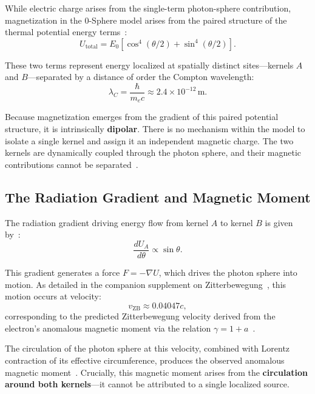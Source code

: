 \documentclass[12pt,letterpaper]{article}
\begin{document}
While electric charge arises from the single-term photon-sphere contribution, magnetization in the 0-Sphere model arises from the paired structure of the thermal potential energy terms~\cite{hanamura18356895}:
\begin{equation}
U_{\mathrm{total}} = E_0 \left[ \cos^4(\theta/2) + \sin^4(\theta/2) \right].
\end{equation}

These two terms represent energy localized at spatially distinct sites—kernels $A$ and $B$—separated by a distance of order the Compton wavelength:
\begin{equation}
\lambda_C = \frac{\hbar}{m_e c} \approx 2.4 \times 10^{-12} \, \mathrm{m}.
\end{equation}

Because magnetization emerges from the gradient of this paired potential structure, it is intrinsically \textbf{dipolar}. There is no mechanism within the model to isolate a single kernel and assign it an independent magnetic charge. The two kernels are dynamically coupled through the photon sphere, and their magnetic contributions cannot be separated~\cite{hanamura18356895,hanamura18511664}.

\subsection{The Radiation Gradient and Magnetic Moment}

The radiation gradient driving energy flow from kernel $A$ to kernel $B$ is given by~\cite{hanamura18356895}:
\begin{equation}
\frac{dU_A}{d\theta} \propto \sin\theta.
\end{equation}

This gradient generates a force $F = -\nabla U$, which drives the photon sphere into motion. As detailed in the companion supplement on Zitterbewegung~\cite{hanamura18356895,hanamura18511664}, this motion occurs at velocity:
\begin{equation}
v_{\mathrm{ZB}} \approx 0.04047c,
\end{equation}
corresponding to the predicted Zitterbewegung velocity derived from the electron's anomalous magnetic moment via the relation $\gamma = 1 + a$~\cite{hanamura17765409}.

The circulation of the photon sphere at this velocity, combined with Lorentz contraction of its effective circumference, produces the observed anomalous magnetic moment~\cite{hanamura17765409,hanamura18511664}. Crucially, this magnetic moment arises from the \textbf{circulation around both kernels}—it cannot be attributed to a single localized source.
\end{document}
